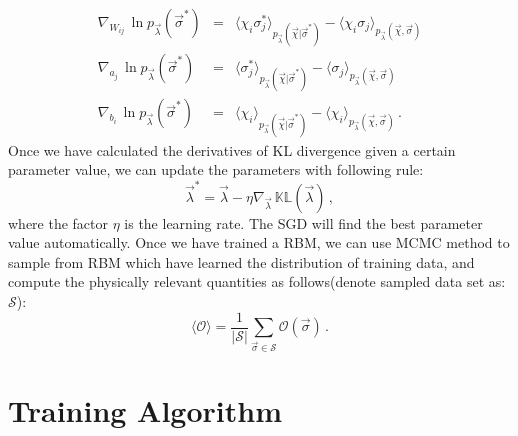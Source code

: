 \documentclass[letterpaper, 10pt]{article}
\newcommand{\qbar}{\rangle}
\newcommand{\qket}{\langle}
\begin{document}
\begin{eqnarray}
\nabla_{W_{ij}} \, \ln{p_{\vec{\lambda}}(\vec{\sigma}^*)} & = & \qket \chi_i \sigma_j^* \qbar_{{p_{\vec{\lambda}}(\vec{\chi} | \vec{\sigma}^*)}} - \qket \chi_i \sigma_j \qbar_{{p_{\vec{\lambda}}(\vec{\chi},\vec{\sigma})}}\label{eq:eq4} \\
\nabla_{a_j} \, \ln{p_{\vec{\lambda}}(\vec{\sigma}^*)} & = & \qket \sigma_j^* \qbar_{{p_{\vec{\lambda}}(\vec{\chi} | \vec{\sigma}^*)}} - \qket \sigma_j \qbar_{{p_{\vec{\lambda}}(\vec{\chi},\vec{\sigma})}}\label{eq:eq5} \\
\nabla_{b_i} \, \ln{p_{\vec{\lambda}}(\vec{\sigma}^*)} & = & \qket \chi_i \qbar_{{p_{\vec{\lambda}}(\vec{\chi} | \vec{\sigma}^*)}} - \qket \chi_i \qbar_{{p_{\vec{\lambda}}(\vec{\chi},\vec{\sigma})}}\,.\label{eq:eq6}
\end{eqnarray}
Once we have calculated the derivatives of KL divergence given a certain parameter value, we can update the parameters with following rule:
\[ \vec{\lambda}^* = \vec{\lambda} - \eta \nabla_{\vec{\lambda}} \, \mathbb{KL}(\vec{\lambda})\,, \]
where the factor $\eta$ is the learning rate. The SGD will find the best parameter value automatically. Once we have trained a RBM, we can use MCMC method to sample from RBM which have learned the distribution of training data, and compute the physically relevant quantities as follows(denote sampled data set as: $\mathcal{S}$):
\[ \qket \mathcal{O} \qbar = \frac{1}{|\mathcal{S}|} \sum_{\vec{\sigma} \in \mathcal{S}} \mathcal{O}(\vec{\sigma})\,. \]


\section{Training Algorithm}
\end{document}
